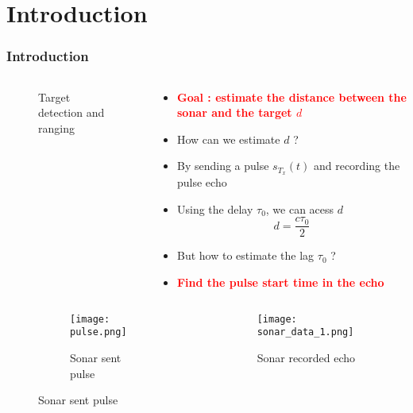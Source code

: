 \documentclass[UKenglish,8pt,aspectratio=1610]{beamer}
\begin{document}
\section{Introduction}
\begin{frame}
\frametitle{Introduction}
	\begin{columns}
	\begin{column}{0.5\textwidth}
		\vspace{-10pt}
	\begin{figure}[h!]
		\caption{Target detection and ranging}
	\end{figure}
	\end{column}
	\begin{column}{0.5\textwidth}
	\begin{itemize}
	\item \textcolor{red}{\textbf{Goal : estimate the distance between the sonar and the target $d$}}
	\item How can we estimate $d$ ? 
	\item By sending a pulse $s_{T_x}(t)$ and recording the pulse echo
	\item Using the delay $\tau_0$, we can acess $d$ 
	\begin{equation}
		d=\dfrac{c\tau_0}{2}
	\end{equation}
	\item But how to estimate the lag $\tau_0$ ? 
	\item \textcolor{red}{\textbf{Find the pulse start time in the echo}}
	\end{itemize}
	\end{column}
\end{columns} 

	\begin{columns}
	\begin{column}{0.5\textwidth}
		\vspace{-10pt}
		\begin{figure}[h!]
	\begin{figure}[h!]
	\centering
	\texttt{[image: pulse.png]}
	\caption{Sonar sent pulse}
\end{figure}
		\end{figure}
	\end{column}
	\begin{column}{0.5\textwidth}
		\vspace{-10pt}
	\begin{figure}[h!]
		\centering
		\texttt{[image: sonar\_data\_1.png]}
		\caption{Sonar recorded echo}
	\end{figure}
	\end{column}
\end{columns} 


\end{frame}
\end{document}

